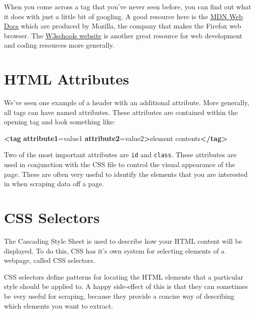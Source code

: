 \documentclass[
  12pt,
]{book}
\newenvironment{Shaded}{\begin{snugshade}}{\end{snugshade}}
\newcommand{\ErrorTok}[1]{\textcolor[rgb]{0.64,0.00,0.00}{\textbf{#1}}}
\newcommand{\KeywordTok}[1]{\textcolor[rgb]{0.13,0.29,0.53}{\textbf{#1}}}
\newcommand{\NormalTok}[1]{#1}
\newcommand{\OtherTok}[1]{\textcolor[rgb]{0.56,0.35,0.01}{#1}}
\newcommand{\StringTok}[1]{\textcolor[rgb]{0.31,0.60,0.02}{#1}}
\begin{document}
When you come across a tag that you've never seen before, you can find out what it does with just a little bit of googling. A good resource here is the \href{https://developer.mozilla.org/en-US/docs/Web/HTML}{MDN Web Docs} which are produced by Mozilla, the company that makes the Firefox web browser. The \href{https://www.w3schools.com/html/default.asp}{W3schools website} is another great resource for web development and coding resources more generally.

\hypertarget{html-attributes}{%
\section{HTML Attributes}\label{html-attributes}}

We've seen one example of a header with an additional attribute. More generally, all tags can have named attributes. These attributes are contained within the opening tag and look something like:

\begin{Shaded}
\begin{Highlighting}[]
\KeywordTok{\textless{}tag} \ErrorTok{attribute1}\OtherTok{=}\StringTok{\textquotesingle{}value1\textquotesingle{}} \ErrorTok{attribute2}\OtherTok{=}\StringTok{\textquotesingle{}value2\textquotesingle{}}\KeywordTok{\textgreater{}}\NormalTok{element contents}\KeywordTok{\textless{}/tag\textgreater{}}
\end{Highlighting}
\end{Shaded}

Two of the most important attributes are \texttt{id} and \texttt{class}. These attributes are used in conjunction with the CSS file to control the visual appearance of the page. These are often very useful to identify the elements that you are interested in when scraping data off a page.

\hypertarget{css-selectors}{%
\section{CSS Selectors}\label{css-selectors}}

The Cascading Style Sheet is used to describe how your HTML content will be displayed. To do this, CSS has it's own system for selecting elements of a webpage, called CSS selectors.

CSS selectors define patterns for locating the HTML elements that a particular style should be applied to. A happy side-effect of this is that they can sometimes be very useful for scraping, because they provide a concise way of describing which elements you want to extract.
\end{document}
